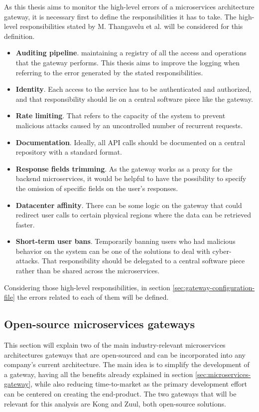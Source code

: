 \documentclass[english, 12pt, a4paper, sci, utf8, a-1b, online]{aaltothesis}
\begin{document}
As this thesis aims to monitor the high-level errors of a microservices architecture gateway, it is necessary first to define the responsibilities it has to take. The high-level responsibilities stated by M. Thangavelu et al. \cite{UberGateway} will be considered for this definition.

\begin{itemize}
    \item \textbf{Auditing pipeline}. maintaining a registry of all the access and operations that the gateway performs. This thesis aims to improve the logging when referring to the error generated by the stated responsibilities.
    \item \textbf{Identity}. Each access to the service has to be authenticated and authorized, and that responsibility should lie on a central software piece like the gateway.
    \item \textbf{Rate limiting}. That refers to the capacity of the system to prevent malicious attacks caused by an uncontrolled number of recurrent requests.
    \item \textbf{Documentation}. Ideally, all API calls should be documented on a central repository with a standard format.
    \item \textbf{Response fields trimming}. As the gateway works as a proxy for the backend microservices, it would be helpful to have the possibility to specify the omission of specific fields on the user's responses.
    \item \textbf{Datacenter affinity}. There can be some logic on the gateway that could redirect user calls to certain physical regions where the data can be retrieved faster.
    \item \textbf{Short-term user bans}. Temporarily banning users who had malicious behavior on the system can be one of the solutions to deal with cyber-attacks. That responsibility should be delegated to a central software piece rather than be shared across the microservices.
\end{itemize}

Considering those high-level responsibilities, in section \ref{sec:gateway-configuration-file} the errors related to each of them will be defined.

\subsection{Open-source microservices gateways}
\label{sec:industry-gateways}

This section will explain two of the main industry-relevant microservices architectures gateways that are open-sourced and can be incorporated into any company's current architecture. The main idea is to simplify the development of a gateway, having all the benefits already explained in section \ref{sec:microservices-gateway}, while also reducing time-to-market as the primary development effort can be centered on creating the end-product. The two gateways that will be relevant for this analysis are Kong and Zuul, both open-source solutions.
\end{document}
